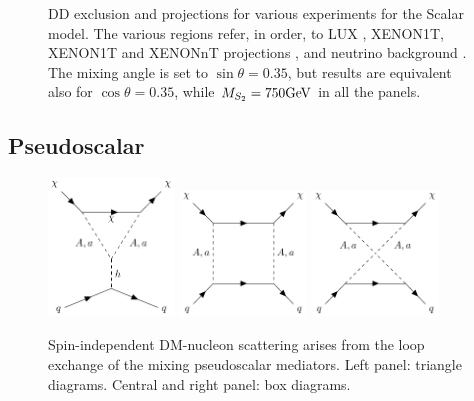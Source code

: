 \begin{figure}[ht]
\begin{center}
\caption{DD exclusion and projections for various experiments for the Scalar model. The various regions refer, in order, to LUX \citep{Akerib:2016vxi}, XENON1T\citep{Aprile:2017iyp}, XENON1T and XENONnT projections \citep{Aprile:2015uzo}, and neutrino background \citep{Billard:2013qya}. The mixing angle is set to $\sin\theta=0.35$, but results are equivalent also for $\cos\theta=0.35$, while $M_{S_2}=750\textrm{GeV}$ in all the panels.} 
\label{fig:SDD}
\end{center}
\end{figure} 

\subsection{Pseudoscalar}

\begin{figure}[ht]
    \centering
    \includegraphics[width=0.3\textwidth]{texinputs/06_comparisons/figures/pseudoTriangle.pdf} \hspace{0.02\textwidth}
    \includegraphics[width=0.3\textwidth]{texinputs/06_comparisons/figures/pseudoBox.pdf} \hspace{0.02\textwidth}
    \includegraphics[width=0.3\textwidth]{texinputs/06_comparisons/figures/pseudoBox2.pdf} 
    \caption{Spin-independent DM-nucleon scattering arises from the loop exchange of the mixing pseudoscalar mediators. Left panel: triangle diagrams. Central and right panel: box diagrams.}
    \label{fig:feynDDPS}
\end{figure}



